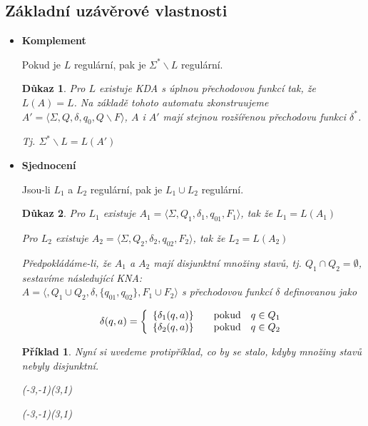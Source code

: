 \documentclass[10pt, a4paper, titlepage]{article}
\theoremstyle{note}
\newtheorem{dukaz}{Důkaz}
\newtheorem{priklad}{Příklad}
\newcommand{\aut}[1]{$A_#1= \langle \Sigma,Q_#1,\delta_#1,q_{0#1},F_#1 \rangle$}
\begin{document}
\subsection{Základní uzávěrové vlastnosti}

\begin{itemize}
\item
\textbf{Komplement}

Pokud je $L$ regulární, pak je $\Sigma^* \backslash L$ regulární.
\begin{dukaz}
Pro $L$ existuje KDA s úplnou přechodovou funkcí tak, že $L(A) = L$. Na základě tohoto automatu zkonstruujeme $A'=\langle \Sigma, Q, \delta,q_0,Q \backslash F \rangle$, $A$ i $A'$ mají stejnou rozšířenou přechodovu funkci $\delta^*$.

Tj. $\Sigma^* \backslash L = L(A')$
\end{dukaz}

\item
\textbf{Sjednocení} 

Jsou-li $L_1$ a $L_2$ regulární, pak je $L_1 \cup L_2$ regulární.

\begin{dukaz}
Pro $L_1$ existuje \aut{1}, tak že $L_1=L(A_1)$

Pro $L_2$ existuje \aut{2}, tak že $L_2=L(A_2)$

Předpokládáme-li, že $A_1$ a $A_2$ mají disjunktní množiny stavů, tj. $Q_1 \cap Q_2 = \emptyset$, sestavíme následující KNA:\\
$A=\langle,Q_1 \cup Q_2,\delta,\lbrace q_{01},q_{02} \rbrace,F_1 \cup F_2 \rangle$ s přechodovou funkcí $\delta$ definovanou jako

$$
\delta(q,a)=\left\{
\begin{array}{l@{\quad\mbox{}\quad}l}
\lbrace \delta_1(q,a) \rbrace & \text{pokud}\quad q \in Q_1\\
\lbrace \delta_2(q,a) \rbrace & \text{pokud}\quad q \in Q_2\\
\end{array}
\right.
$$
\end{dukaz}
\begin{priklad}
Nyní si uvedeme protipříklad, co by se stalo, kdyby množiny stavů nebyly disjunktní.

\begin{center}
\begin{VCPicture}{(-3,-1)(3,1)}
\end{VCPicture}
\end{center}
\begin{center}
\begin{VCPicture}{(-3,-1)(3,1)}
\end{VCPicture}
\end{center}


\end{priklad}
\end{itemize}
\end{document}
